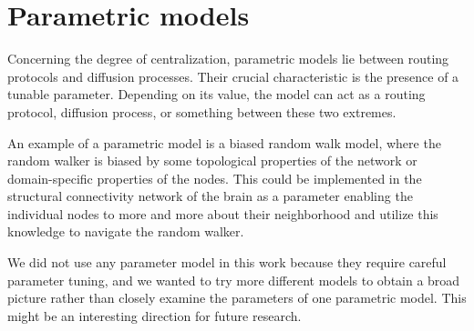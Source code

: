 \section{Parametric models}

Concerning the degree of centralization, parametric models lie between routing protocols and diffusion processes. Their crucial characteristic is the presence of a tunable parameter. Depending on its value, the model can act as a routing protocol, diffusion process, or something between these two extremes. \cite{seguin_brain_2023}

An example of a parametric model is a biased random walk model, where the random walker is biased by some topological properties of the network or domain-specific properties of the nodes. This could be implemented in the structural connectivity network of the brain as a parameter enabling the individual nodes to  more and more about their neighborhood and utilize this knowledge to navigate the random walker. \cite{seguin_brain_2023}

We did not use any parameter model in this work because they require careful parameter tuning, and we wanted to try more different models to obtain a broad picture rather than closely examine the parameters of one parametric model. This might be an interesting direction for future research.
